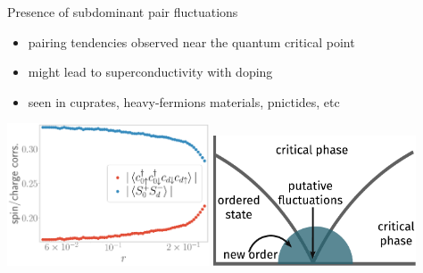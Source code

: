 \documentclass[8pt,aspectratio=169]{beamer}
\begin{document}
\begin{frame}{Presence of subdominant pair fluctuations}
	
\begin{itemize}
	\item \alert{pairing tendencies} observed near the quantum critical point\\[10pt]
	\item might lead to \alert{superconductivity} with doping\\[10pt]
	\item seen in cuprates, heavy-fermions materials, pnictides, etc\\[10pt]
\end{itemize}
\includegraphics[width=0.45\textwidth]{odlro_d0.pdf}
\hspace*{\fill}
\includegraphics[width=0.45\textwidth]{gen-phase-diagram.pdf}
\end{frame}
\end{document}
